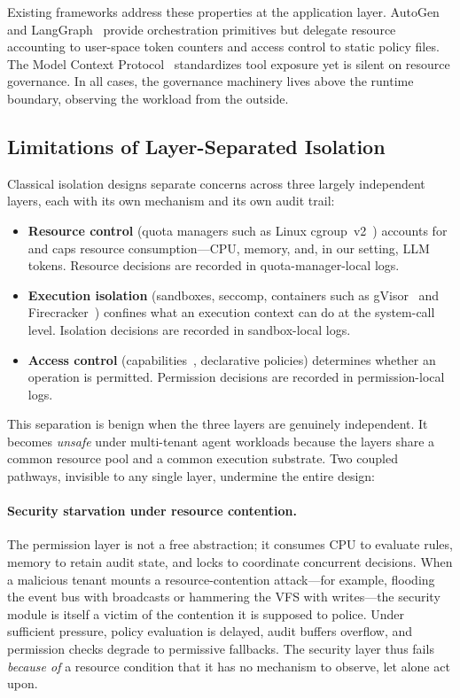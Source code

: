 Existing frameworks address these properties at the application layer.
AutoGen~\cite{wu2023autogen} and LangGraph~\cite{langgraph2024} provide
orchestration primitives but delegate resource accounting to user-space token
counters and access control to static policy files. The Model Context
Protocol~\cite{anthropic2024mcp} standardizes tool exposure yet is silent on
resource governance. In all cases, the governance machinery lives above the
runtime boundary, observing the workload from the outside.

\subsection{Limitations of Layer-Separated Isolation}
\label{sec:bg-lim}

Classical isolation designs separate concerns across three largely independent
layers, each with its own mechanism and its own audit trail:

\begin{itemize}
    \item \textbf{Resource control} (quota managers such as Linux
    cgroup~v2~\cite{linux2024cgroupv2}) accounts for and caps resource
    consumption---CPU, memory, and, in our setting, LLM tokens. Resource
    decisions are recorded in quota-manager-local logs.
    \item \textbf{Execution isolation} (sandboxes, seccomp, containers such as
    gVisor~\cite{young2023gvisor} and Firecracker~\cite{agache2020firecracker})
    confines what an execution context can do at the system-call level.
    Isolation decisions are recorded in sandbox-local logs.
    \item \textbf{Access control} (capabilities~\cite{mercer2012capsicum,klein2009sel4},
    declarative policies) determines whether an operation is
    permitted. Permission decisions are recorded in permission-local logs.
\end{itemize}

This separation is benign when the three layers are genuinely independent. It
becomes \emph{unsafe} under multi-tenant agent workloads because the layers
share a common resource pool and a common execution substrate. Two coupled
pathways, invisible to any single layer, undermine the entire design:

\paragraph{Security starvation under resource contention.}
The permission layer is not a free abstraction; it consumes CPU to evaluate
rules, memory to retain audit state, and locks to coordinate concurrent
decisions. When a malicious tenant mounts a resource-contention attack---for
example, flooding the event bus with broadcasts or hammering the VFS with
writes---the security module is itself a victim of the contention it is
supposed to police. Under sufficient pressure, policy evaluation is delayed,
audit buffers overflow, and permission checks degrade to permissive fallbacks.
The security layer thus fails \emph{because of} a resource condition that it
has no mechanism to observe, let alone act upon.


